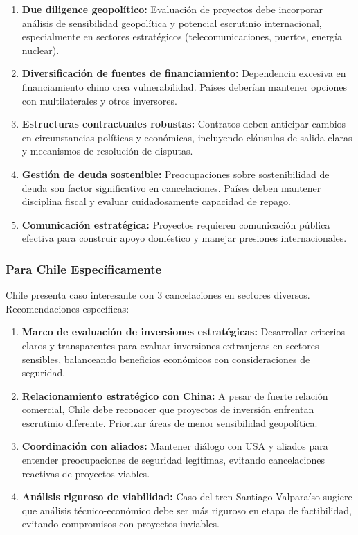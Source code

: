 \documentclass[12pt]{article}
\begin{document}
\begin{enumerate}
    \item \textbf{Due diligence geopolítico:} Evaluación de proyectos debe incorporar análisis de sensibilidad geopolítica y potencial escrutinio internacional, especialmente en sectores estratégicos (telecomunicaciones, puertos, energía nuclear).
    
    \item \textbf{Diversificación de fuentes de financiamiento:} Dependencia excesiva en financiamiento chino crea vulnerabilidad. Países deberían mantener opciones con multilaterales y otros inversores.
    
    \item \textbf{Estructuras contractuales robustas:} Contratos deben anticipar cambios en circunstancias políticas y económicas, incluyendo cláusulas de salida claras y mecanismos de resolución de disputas.
    
    \item \textbf{Gestión de deuda sostenible:} Preocupaciones sobre sostenibilidad de deuda son factor significativo en cancelaciones. Países deben mantener disciplina fiscal y evaluar cuidadosamente capacidad de repago.
    
    \item \textbf{Comunicación estratégica:} Proyectos requieren comunicación pública efectiva para construir apoyo doméstico y manejar presiones internacionales.
\end{enumerate}

\subsubsection{Para Chile Específicamente}

Chile presenta caso interesante con 3 cancelaciones en sectores diversos. Recomendaciones específicas:

\begin{enumerate}
    \item \textbf{Marco de evaluación de inversiones estratégicas:} Desarrollar criterios claros y transparentes para evaluar inversiones extranjeras en sectores sensibles, balanceando beneficios económicos con consideraciones de seguridad.
    
    \item \textbf{Relacionamiento estratégico con China:} A pesar de fuerte relación comercial, Chile debe reconocer que proyectos de inversión enfrentan escrutinio diferente. Priorizar áreas de menor sensibilidad geopolítica.
    
    \item \textbf{Coordinación con aliados:} Mantener diálogo con USA y aliados para entender preocupaciones de seguridad legítimas, evitando cancelaciones reactivas de proyectos viables.
    
    \item \textbf{Análisis riguroso de viabilidad:} Caso del tren Santiago-Valparaíso sugiere que análisis técnico-económico debe ser más riguroso en etapa de factibilidad, evitando compromisos con proyectos inviables.
\end{enumerate}
\end{document}

